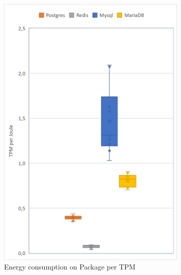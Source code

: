 \begin{figure}[!ht]
        \centering
        \begin{subfigure}[b]{0.30\textwidth}
            \centering
			\includegraphics[width=1\columnwidth]{results/boxplot/Packgage-tpm.png}
			\caption[]%
            {{\small Energy consumption on Package per TPM}}    
			\label{fig:bocplottranspackage}
        \end{subfigure}
        \begin{subfigure}[b]{0.30\textwidth}  
            \centering 

\end{subfigure}
\end{figure}
